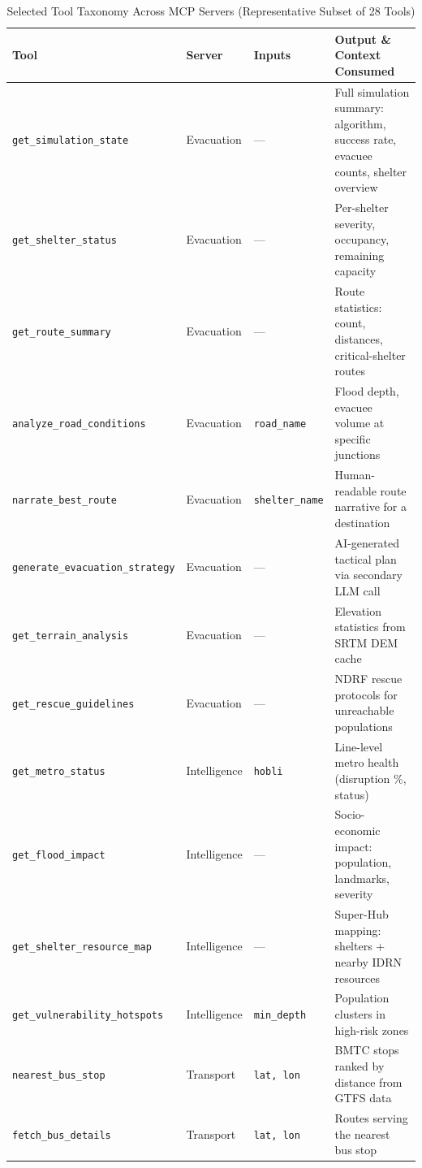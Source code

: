 \documentclass[journal]{IEEEtran}
\begin{document}
\begin{table}[!t]
    \centering
    \caption{Selected Tool Taxonomy Across MCP Servers (Representative Subset of 28 Tools)}
    \label{tab:tool_taxonomy}
    \begin{tabular}{@{}lllp{4.5cm}@{}}
        \toprule
        \textbf{Tool} & \textbf{Server} & \textbf{Inputs}
            & \textbf{Output \& Context Consumed} \\
        \midrule
        \texttt{get\_simulation\_state} & Evacuation & ---
            & Full simulation summary: algorithm, success rate, evacuee
            counts, shelter overview \\
        \texttt{get\_shelter\_status} & Evacuation & ---
            & Per-shelter severity, occupancy, remaining capacity \\
        \texttt{get\_route\_summary} & Evacuation & ---
            & Route statistics: count, distances, critical-shelter routes \\
        \texttt{analyze\_road\_conditions} & Evacuation & \texttt{road\_name}
            & Flood depth, evacuee volume at specific junctions \\
        \texttt{narrate\_best\_route} & Evacuation & \texttt{shelter\_name}
            & Human-readable route narrative for a destination \\
        \texttt{generate\_evacuation\_strategy} & Evacuation & ---
            & AI-generated tactical plan via secondary LLM call \\
        \texttt{get\_terrain\_analysis} & Evacuation & ---
            & Elevation statistics from SRTM DEM cache \\
        \texttt{get\_rescue\_guidelines} & Evacuation & ---
            & NDRF rescue protocols for unreachable populations \\
        \midrule
        \texttt{get\_metro\_status} & Intelligence & \texttt{hobli}
            & Line-level metro health (disruption \%, status) \\
        \texttt{get\_flood\_impact} & Intelligence & ---
            & Socio-economic impact: population, landmarks, severity \\
        \texttt{get\_shelter\_resource\_map} & Intelligence & ---
            & Super-Hub mapping: shelters + nearby IDRN resources \\
        \texttt{get\_vulnerability\_hotspots} & Intelligence
            & \texttt{min\_depth} & Population clusters in high-risk zones \\
        \midrule
        \texttt{nearest\_bus\_stop} & Transport & \texttt{lat, lon}
            & BMTC stops ranked by distance from GTFS data \\
        \texttt{fetch\_bus\_details} & Transport & \texttt{lat, lon}
            & Routes serving the nearest bus stop \\
        \bottomrule
    \end{tabular}
\end{table}
\end{document}

